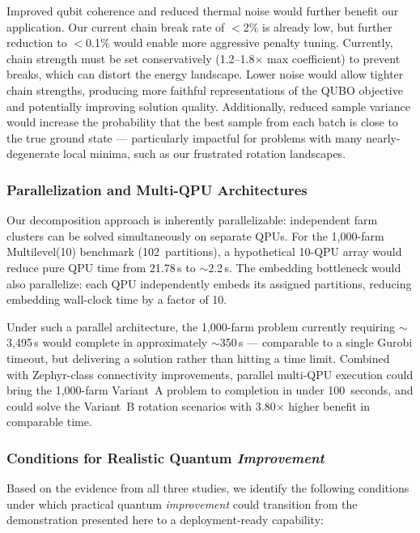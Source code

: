 Improved qubit coherence and reduced thermal noise would further benefit our application. Our current chain break rate of $<$2\% is already low, but further reduction to $<$0.1\% would enable more aggressive penalty tuning. Currently, chain strength must be set conservatively (1.2--1.8$\times$ max coefficient) to prevent breaks, which can distort the energy landscape. Lower noise would allow tighter chain strengths, producing more faithful representations of the QUBO objective and potentially improving solution quality. Additionally, reduced sample variance would increase the probability that the best sample from each batch is close to the true ground state --- particularly impactful for problems with many nearly-degenerate local minima, such as our frustrated rotation landscapes.

\subsubsection{Parallelization and Multi-QPU Architectures}

Our decomposition approach is inherently parallelizable: independent farm clusters can be solved simultaneously on separate QPUs. For the 1,000-farm Multilevel(10) benchmark (102~partitions), a hypothetical 10-QPU array would reduce pure QPU time from 21.78\,s to $\sim$2.2\,s. The embedding bottleneck would also parallelize: each QPU independently embeds its assigned partitions, reducing embedding wall-clock time by a factor of 10.

Under such a parallel architecture, the 1,000-farm problem currently requiring $\sim$3,495\,s would complete in approximately $\sim$350\,s --- comparable to a single Gurobi timeout, but delivering a solution rather than hitting a time limit. Combined with Zephyr-class connectivity improvements, parallel multi-QPU execution could bring the 1,000-farm Variant~A problem to completion in under 100~seconds, and could solve the Variant~B rotation scenarios with 3.80$\times$ higher benefit in comparable time.

\subsubsection{Conditions for Realistic Quantum \textit{Improvement}}

Based on the evidence from all three studies, we identify the following conditions under which practical quantum \textit{improvement} could transition from the demonstration presented here to a deployment-ready capability:

